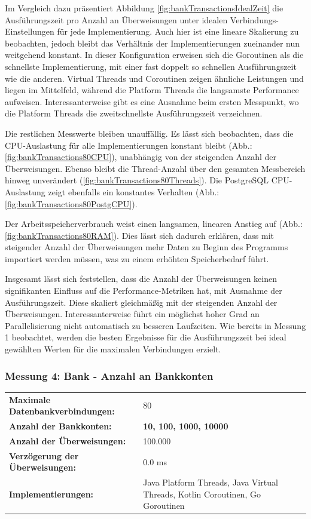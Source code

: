 \documentclass[fontsize=12pt,paper=a4,twoside=semi,parskip=half-,headsepline,headinclude]{scrreprt}
\begin{document}
Im Vergleich dazu präsentiert Abbildung \ref{fig:bankTransactionsIdealZeit} die Ausführungszeit pro Anzahl an Überweisungen unter idealen Verbindungs-Einstellungen für jede Implementierung. Auch hier ist eine lineare Skalierung zu beobachten, jedoch bleibt das Verhältnis der Implementierungen zueinander nun weitgehend konstant. In dieser Konfiguration erweisen sich die Goroutinen als die schnellste Implementierung, mit einer fast doppelt so schnellen Ausführungszeit wie die anderen. Virtual Threads und Coroutinen zeigen ähnliche Leistungen und liegen im Mittelfeld, während die Platform Threads die langsamste Performance aufweisen. Interessanterweise gibt es eine Ausnahme beim ersten Messpunkt, wo die Platform Threads die zweitschnellste Ausführungszeit verzeichnen.

Die restlichen Messwerte bleiben unauffällig. Es lässt sich beobachten, dass die CPU-Auslastung für alle Implementierungen konstant bleibt (Abb.: \ref{fig:bankTransactions80CPU}), unabhängig von der steigenden Anzahl der Überweisungen. Ebenso bleibt die Thread-Anzahl über den gesamten Messbereich hinweg unverändert (\ref{fig:bankTransactions80Threads}). Die PostgreSQL CPU-Auslastung zeigt ebenfalls ein konstantes Verhalten (Abb.: \ref{fig:bankTransactions80PostgCPU}).

Der Arbeitsspeicherverbrauch weist einen langsamen, linearen Anstieg auf (Abb.: \ref{fig:bankTransactions80RAM}). Dies lässt sich dadurch erklären, dass mit steigender Anzahl der Überweisungen mehr Daten zu Beginn des Programms importiert werden müssen, was zu einem erhöhten Speicherbedarf führt.

Insgesamt lässt sich feststellen, dass die Anzahl der Überweisungen keinen signifikanten Einfluss auf die Performance-Metriken hat, mit Ausnahme der Ausführungszeit. Diese skaliert gleichmäßig mit der steigenden Anzahl der Überweisungen. Interessanterweise führt ein möglichst hoher Grad an Parallelisierung nicht automatisch zu besseren Laufzeiten. Wie bereits in Messung 1 beobachtet, werden die besten Ergebnisse für die Ausführungszeit bei ideal gewählten Werten für die maximalen Verbindungen erzielt.

\subsubsection{Messung 4: Bank - Anzahl an Bankkonten}

\begin{tabularx}{\textwidth}{@{}lX@{}}
	\textbf{Maximale Datenbankverbindungen:} & 80 \\
	\textbf{Anzahl der Bankkonten:} & \textbf{10, 100, 1000, 10000} \\
	\textbf{Anzahl der Überweisungen:} & 100.000 \\
	\textbf{Verzögerung der Überweisungen:} & 0.0 ms \\
	\textbf{Implementierungen:} & Java Platform Threads, Java Virtual Threads, Kotlin Coroutinen, Go Goroutinen
\end{tabularx}
\end{document}

